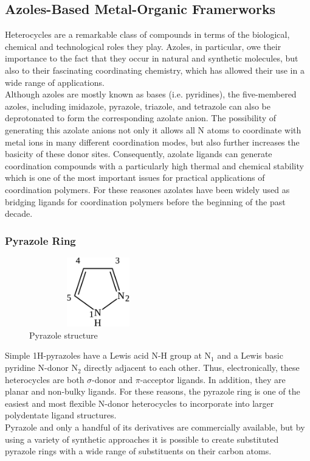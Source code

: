 \documentclass[../Master.tex]{subfiles}
\begin{document}
\subsection{Azoles-Based Metal-Organic Framerworks}\label{az-mof}
Heterocycles are a remarkable class of compounds in terms of the biological, chemical and technological roles they play. Azoles, in particular, owe their importance to the fact that they occur in natural and synthetic molecules, but also to their fascinating coordinating chemistry, which has allowed their use in a wide range of applications. \\
Although azoles are mostly known as bases (i.e. pyridines), the five-membered azoles, including imidazole, pyrazole, triazole, and tetrazole can also be deprotonated to form the corresponding azolate anion. The possibility of generating this azolate anions not only it allows all N atoms to coordinate with metal ions in many different coordination modes, but also further increases the basicity of these donor sites. Consequently, azolate ligands can generate coordination compounds with a particularly high thermal and chemical stability  which is one of the most important issues for practical applications of coordination polymers.
For these reasones azolates have been widely used as bridging ligands for coordination polymers before the beginning of the past decade.
\subsubsection{Pyrazole Ring}
\begin{figure}[h]
	\centering
	\includegraphics[width=6cm,height=3cm,keepaspectratio]{Structures/pyrazole.eps}
	\caption{Pyrazole structure}
	\label{fig:pyrstc}
\end{figure}
Simple 1H-pyrazoles have a Lewis acid N-H group at N$_1$ and a Lewis basic pyridine N-donor N$_2$ directly adjacent to each other. Thus, electronically, these heterocycles are both $\sigma$-donor and $\pi$-acceptor ligands. In addition, they are planar and non-bulky ligands. For these reasons, the pyrazole ring is one of the easiest and most flexible N-donor heterocycles to incorporate into larger polydentate ligand structures. \\
Pyrazole and only a handful of its derivatives are commercially available, but by using a variety of synthetic approaches it is possible to create substituted pyrazole rings with a wide range of substituents on their carbon atoms.
\end{document}
